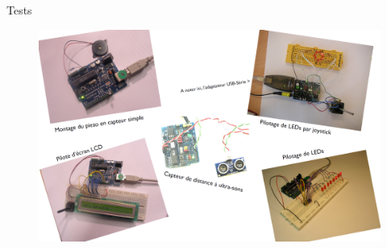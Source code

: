 \documentclass[]{beamer}
\begin{document}
\begin{frame}
\begin{figure}
\begin{center}
				\end{center}
			\end{figure}
	\end{frame}
	\begin{frame}
	{Tests}
			\begin{figure}
				\begin{center}
					\includegraphics[scale=0.5]{test3.png}
				\end{center}
			\end{figure}
	\end{frame}
\end{document}
